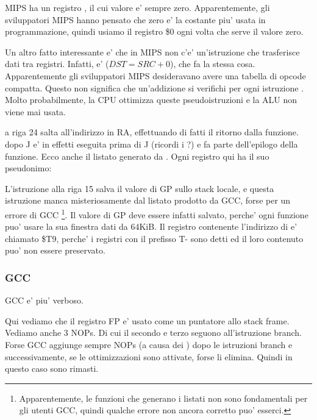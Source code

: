 MIPS ha un registro , il cui valore e' sempre zero.
Apparentemente, gli sviluppatori MIPS hanno pensato che zero e' la costante piu' usata in programmazione, quindi usiamo il registro \$0
 ogni volta che serve il valore zero.

Un altro fatto interessante e' che in MIPS non c'e' un'istruzione che trasferisce dati tra registri.
Infatti,  e'  ($DST=SRC+0$), che fa la stessa cosa.
Apparentemente gli sviluppatori MIPS desideravano avere una tabella di opcode compatta.
Questo non significa che un'addizione si verifichi per ogni istruzione .
Molto probabilmente, la \ac{CPU} ottimizza queste pseudoistruzioni e la \ac{ALU} non viene mai usata.


 a riga 24 salta all'indirizzo in \ac{RA}, effettuando di fatti il ritorno dalla funzione.
 dopo J e' in effetti eseguita prima di J (ricordi i ?) e fa parte dell'epilogo della funzione.
Ecco anche il listato generato da \IDA. Ogni registro qui ha il suo pseudonimo:



L'istruzione alla riga 15 salva il valore di GP sullo stack locale, e questa istruzione manca misteriosamente dal listato prodotto da GCC, forse per un errore di GCC
\footnote{Apparentemente, le funzioni che generano i listati non sono fondamentali per gli utenti GCC, quindi qualche errore
non ancora corretto puo' esserci.}.
Il valore di GP deve essere infatti salvato, perche' ogni funzione puo' usare la sua finestra dati da 64KiB.
Il registro contenente l'indirizzo di \puts e' chiamato \$T9, perche' i registri con il prefisso T- sono detti 
 ed il loro contenuto puo' non essere preservato.

\subsubsection{\NonOptimizing GCC}

\NonOptimizing GCC e' piu' verboso.



Qui vediamo che il registro FP e' usato come un puntatore allo stack frame.
Vediamo anche 3 \ac{NOP}s.
Di cui il secondo e terzo seguono all'istruzione branch.
Forse GCC aggiunge sempre \ac{NOP}s (a causa dei ) dopo le istruzioni branch
e successivamente, se le ottimizzazioni sono attivate, forse li elimina.
Quindi in questo caso sono rimasti.

